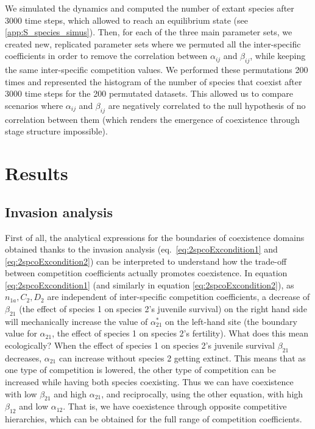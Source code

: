 \documentclass{article}
\begin{document}
We simulated the dynamics and computed the number of extant species after 3000 time steps, which allowed to reach an equilibrium state (see  \ref{app:S_species_simus}). Then, for each of the three main parameter sets, we created new, replicated parameter sets where we permuted all the inter-specific coefficients in order to remove the correlation between $\alpha_{ij}$ and $\beta_{ij}$, while keeping the same inter-specific competition values. We performed these permutations 200 times and represented the histogram of the number of species that coexist after 3000 time steps for the 200 permutated datasets. This allowed us to compare scenarios where $\alpha_{ij}$ and $\beta_{ij}$ are negatively correlated to the null hypothesis of no correlation between them (which renders the emergence of coexistence through stage structure impossible). 

\section{Results}

\subsection{Invasion analysis}

First of all, the analytical expressions for the boundaries of coexistence domains obtained thanks to the invasion analysis (eq.~\ref{eq:2spcoExcondition1} and \ref{eq:2spcoExcondition2}) can be interpreted to understand how the trade-off between competition coefficients actually promotes coexistence. In equation \ref{eq:2spcoExcondition1} (and similarly in equation \ref{eq:2spcoExcondition2}), as $n_{1a},C_2,D_2$ are independent of inter-specific competition coefficients, a decrease of $\beta_{21}$ (the effect of species 1 on species 2's juvenile survival) on the right hand side will mechanically increase the value of $\alpha^*_{21}$ on the left-hand site (the boundary value for $\alpha_{21}$, the effect of species 1 on species 2's fertility). What does this mean ecologically? When the effect of species 1 on species 2's juvenile survival $\beta_{21}$ decreases, $\alpha_{21}$ can increase without species 2 getting extinct. This means that as one type of competition is lowered, the other type of competition can be increased while having both species coexisting. Thus we can have coexistence with low $\beta_{21}$ and high $\alpha_{21}$, and reciprocally, using the other equation, with high $\beta_{12}$ and low $\alpha_{12}$. That is, we have coexistence through opposite competitive hierarchies, which can be obtained for the full range of competition coefficients.   
\end{document}
